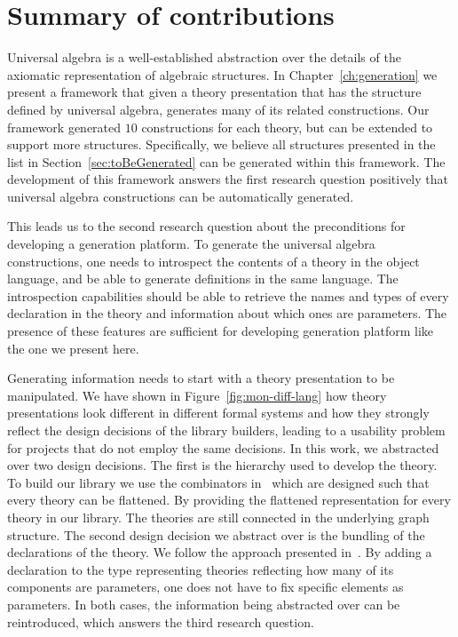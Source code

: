 
\section{Summary of contributions}
\label{conc:summary}
Universal algebra is a well-established abstraction over the details of the axiomatic representation of algebraic structures. In Chapter~\ref{ch:generation} we present a framework that given a theory presentation that has the structure defined by universal algebra, generates many of its related constructions. Our framework generated $10$ constructions for each theory, but can be extended to support more structures. Specifically, we believe all structures presented in the list in Section~\ref{sec:toBeGenerated} can be generated within this framework. The development of this framework answers the first research question positively that universal algebra constructions can be automatically generated. 

This leads us to the second research question about the preconditions for developing a generation platform. To generate the universal algebra constructions, one needs to introspect the contents of a theory in the object language, and be able to generate definitions in the same language. The introspection capabilities should be able to retrieve the names and types of every declaration in the theory and information about which ones are parameters. The presence of these features are sufficient for developing generation platform like the one we present here. 

Generating information needs to start with a theory presentation to be manipulated. We have shown in Figure~\ref{fig:mon-diff-lang} how theory presentations look different in different formal systems and how they strongly reflect the design decisions of the library builders, leading to a usability problem for projects that do not employ the same decisions. In this work, we abstracted over two design decisions. The first is the hierarchy used to develop the theory. To build our library we use the combinators in~\cite{carette2018building} which are designed such that every theory can be flattened.  By providing the flattened representation for every theory in our library. The theories are still connected in the underlying graph structure. The second design decision we abstract over is the bundling of the declarations of the theory. We follow the approach presented in~\cite{alhassy2019}. By adding a declaration to the type representing theories reflecting how many of its components are parameters, one does not have to fix specific elements as parameters. In both cases, the information being abstracted over can be reintroduced, which answers the third research question.  


